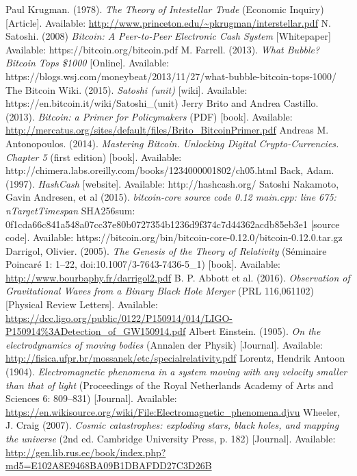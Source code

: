 \documentclass[conference]{IEEEtran}
\begin{document}

\begin{thebibliography}{9}
	Paul Krugman.
	(1978).	
	\textit{The Theory of Intestellar Trade}
	(Economic Inquiry)
	[Article].
	Available: \url{http://www.princeton.edu/~pkrugman/interstellar.pdf}
	N. Satoshi. 
	(2008)
	\textit{Bitcoin: A Peer-to-Peer Electronic Cash System}
	[Whitepaper]
	Available: https://bitcoin.org/bitcoin.pdf
	M. Farrell. 
	(2013).	
	\textit{What Bubble? Bitcoin Tops \$1000}
	[Online].
	Available: https://blogs.wsj.com/moneybeat/2013/11/27/what-bubble-bitcoin-tops-1000/
	The Bitcoin Wiki.
	(2015).	
	\textit{Satoshi (unit)}
	[wiki].
	Available: https://en.bitcoin.it/wiki/Satoshi\_(unit)
	Jerry Brito and Andrea Castillo.
	(2013).	
	\textit{Bitcoin: a Primer for Policymakers}
	(PDF)
	[book].
	Available: \url{http://mercatus.org/sites/default/files/Brito_BitcoinPrimer.pdf}		
	Andreas M. Antonopoulos.
	(2014).
	\textit{Mastering Bitcoin. Unlocking Digital Crypto-Currencies. Chapter 5}
	(first edition)
	[book].
	Available: http://chimera.labs.oreilly.com/books/1234000001802/ch05.html
	Back, Adam. 
	(1997).	
	\textit{HashCash}
	[website].
	Available: http://hashcash.org/
	Satoshi Nakamoto, Gavin Andresen, et al
	(2015).	
	\textit{bitcoin-core source code 0.12 main.cpp: line 675: nTargetTimespan}
	SHA256sum: 0f1cda66c841a548a07cc37e80b0727354b1236d9f374c7d44362acdb85eb3e1
	[source code].
	Available: https://bitcoin.org/bin/bitcoin-core-0.12.0/bitcoin-0.12.0.tar.gz
	Darrigol, Olivier.
	(2005).	
	\textit{The Genesis of the Theory of Relativity}
	(Séminaire Poincaré 1: 1–22, doi:10.1007/3-7643-7436-5\_1)
	[book].
	Available: \url{http://www.bourbaphy.fr/darrigol2.pdf}
	B. P. Abbott et al. 
	(2016).	
	\textit{Observation of Gravitational Waves from a Binary Black Hole Merger}
	(PRL 116,061102)
	[Physical Review Letters].
	Available: \url{https://dcc.ligo.org/public/0122/P150914/014/LIGO-P150914\%3ADetection_of_GW150914.pdf}
	Albert Einstein. 
	(1905).	
	\textit{On the electrodynamics of moving bodies}
	(Annalen der Physik)
	[Journal].
	Available: \url{http://fisica.ufpr.br/mossanek/etc/specialrelativity.pdf}
	Lorentz, Hendrik Antoon
	(1904).	
	\textit{Electromagnetic phenomena in a system moving with any velocity smaller than that of light}
	(Proceedings of the Royal Netherlands Academy of Arts and Sciences 6: 809–831)
	[Journal].
	Available: \url{https://en.wikisource.org/wiki/File:Electromagnetic_phenomena.djvu}
	Wheeler, J. Craig 
	(2007).	
	\textit{ Cosmic catastrophes: exploding stars, black holes, and mapping the universe}
	(2nd ed. Cambridge University Press, p. 182)
	[Journal].
	Available: \url{http://gen.lib.rus.ec/book/index.php?md5=E102A8E9468BA09B1DBAFDD27C3D26B}





\end{thebibliography}
\end{document}
